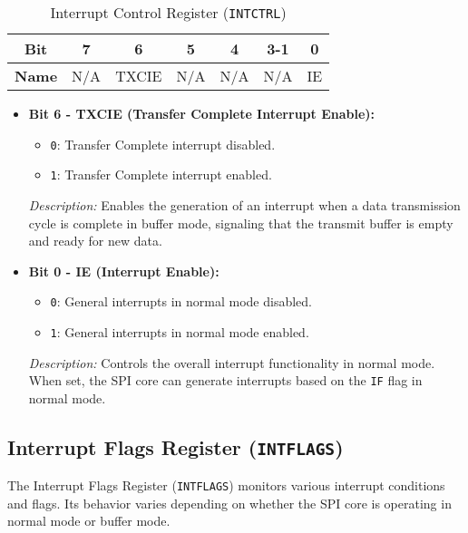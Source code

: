   \begin{table}[H]
      \centering
      \caption{Interrupt Control Register (\texttt{INTCTRL})}
      \begin{tabular}{@{}ccccccc@{}}
          \toprule
          \textbf{Bit} & 7 & 6 & 5 & 4 & 3-1 & 0 \\ \midrule
          \textbf{Name} & N/A & TXCIE & N/A & N/A & N/A & IE \\ \bottomrule
      \end{tabular}
      \label{tab:intctrl}
  \end{table}
  
  \begin{itemize}
      
      \item \textbf{Bit 6 - TXCIE (Transfer Complete Interrupt Enable):} 
      \begin{itemize}
          \item \texttt{0}: Transfer Complete interrupt disabled.
          \item \texttt{1}: Transfer Complete interrupt enabled.
      \end{itemize}
      \textit{Description:} Enables the generation of an interrupt when a data transmission cycle is complete in buffer mode, signaling that the transmit buffer is empty and ready for new data.
      
      \item \textbf{Bit 0 - IE (Interrupt Enable):} 
      \begin{itemize}
          \item \texttt{0}: General interrupts in normal mode disabled.
          \item \texttt{1}: General interrupts in normal mode enabled.
      \end{itemize}
      \textit{Description:} Controls the overall interrupt functionality in normal mode. When set, the SPI core can generate interrupts based on the \texttt{IF} flag in normal mode.
  \end{itemize}
  
  \subsection{Interrupt Flags Register (\texttt{INTFLAGS})}
  \label{sec:intflags}
  
  The Interrupt Flags Register (\texttt{INTFLAGS}) monitors various interrupt conditions and flags. Its behavior varies depending on whether the SPI core is operating in normal mode or buffer mode.
  
